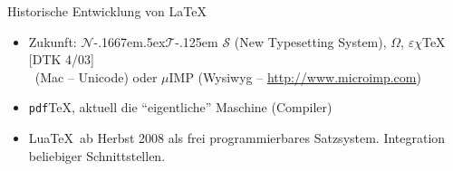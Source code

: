 \documentclass[ngerman,size=12pt,mode=present,paper=a4paper,
style=BerlinFU,mode=present]{pst-powerdot}
\begin{document}
\begin{slide}{Historische Entwicklung von \LaTeX}
  \def\NtS{$\mathcal{N}$\kern-.1667em\lower.5ex\hbox{$\mathcal{T}$}\kern-.125em  $\mathcal{S}$} %
  \begin{itemize}[type=1]%
   \item Zukunft: \NtS\/ {\tiny (New Typesetting System)}, $\Omega$, 
             $\varepsilon${\tiny$\chi$}\kern-2pt\TeX\/ [DTK 4/03]\\
		\XeTeX\ (Mac -- Unicode) oder $\mu$IMP (Wysiwyg -- \url{http://www.microimp.com}) 		\pause
    \item \texttt{pdf}\TeX, aktuell die "`eigentliche"' Maschine (Compiler)		\pause
    \item Lua\TeX\ ab Herbst 2008 als frei programmierbares Satzsystem. Integration beliebiger 
    Schnittstellen.		\pause
  \end{itemize}
\end{slide}
\end{document}
